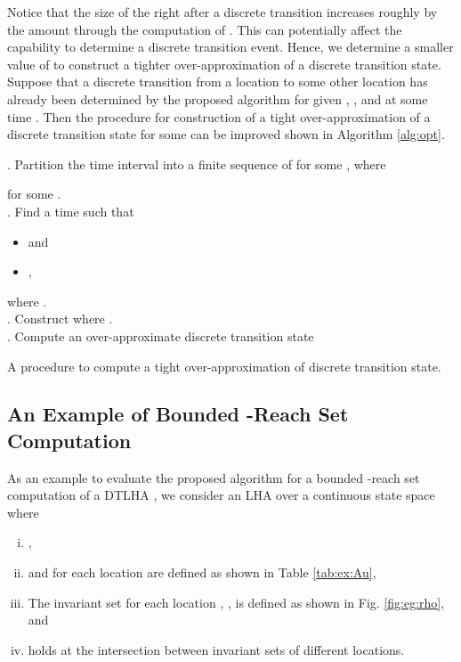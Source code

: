 Notice that the size of the  right after a discrete transition increases roughly by the amount  through the computation of . 
This can potentially affect the capability to determine a discrete transition event.
Hence, we determine a smaller value of  to construct a tighter over-approximation of a discrete transition state. 
Suppose that a discrete transition from a location  to some other location  has already been determined by the proposed algorithm for given , , and  at some time .
Then the procedure for construction of a tight over-approximation of a discrete transition state  for some  can be improved shown in Algorithm \ref{alg:opt}.


\begin{algorithm} \SetAlgoLined 
{}. Partition the time interval  into a finite sequence of  for some , where

for some . \\
. Find a time  such that 
	\begin{itemize}
		\item  and
		\item , 
	\end{itemize}
	where . \\
. Construct  where . \\
. Compute an over-approximate discrete transition state

\caption{A procedure to compute a tight over-approximation of discrete transition state.}
\label{alg:opt}
\end{algorithm}




\subsection{An Example of Bounded -Reach Set Computation}  \label{sec:imp:example}

As an example to evaluate the proposed algorithm for a bounded -reach set computation of a DTLHA , we consider an LHA  over a  continuous state space  where
\begin{enumerate}[(i)]
	\item  ,
	\item  and  for each location  are defined as shown in Table \ref{tab:ex:Au},  
	\item The invariant set for each location , , is defined as shown in Fig. \ref{fig:eg:rho}, and
	\item  holds at the intersection between invariant sets of different locations. 
\end{enumerate}

